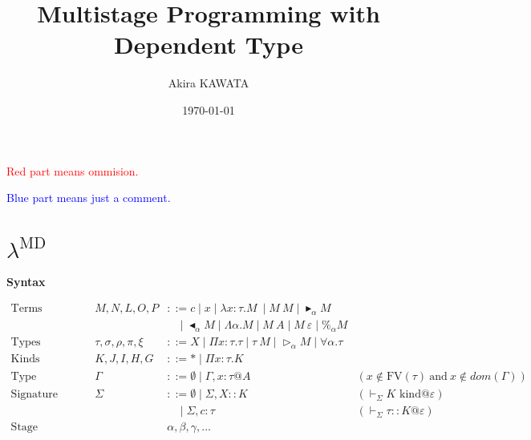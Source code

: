\documentclass[9pt, a4paper]{extarticle}
\title{Multistage Programming with Dependent Type}
\author{Akira KAWATA}
\date{\today}
\theoremstyle{break}
\newcommand{\figheader}[2]{
  \begin{flushleft}
    #2 {\bf \normalsize #1}
\end{flushleft}}
\newcommand{\G}{\Gamma}
\newcommand{\V}{\vdash_\Sigma}
\newcommand{\iskind}{\text{\ kind}}
\newcommand{\TW}{\triangleright}
\newcommand{\F}{\forall}
\newcommand{\TB}{\blacktriangleright}
\newcommand{\TBL}{\blacktriangleleft}
\newcommand{\red}[1]{\textcolor{red}{ #1 }}
\newcommand{\blue}[1]{\textcolor{blue}{ #1 }}
\begin{document}
\maketitle

\red{Red part means ommision.}

\blue{Blue part means just a comment.}

\section{ $ \lambda^{\text{MD}} $ }

\figheader{Syntax}{}

\begin{align*}
	\textrm{Terms}             &  & M,N,L,O,P                & ::= c \mid x \mid \lambda x:\tau.M\ \mid M\ M \mid \TB_\alpha M                                                                                    \\
	                           &  &                          & \ \ \ \ \mid \TBL_\alpha M \mid \Lambda\alpha.M \mid M\ A \mid M\ \varepsilon \mid \%_\alpha M                                                                       \\
	\textrm{Types}             &  & \tau,\sigma,\rho,\pi,\xi & ::= X \mid \Pi x:\tau.\tau \mid \tau\ M \mid \TW_{\alpha} M \mid \F\alpha.\tau                                                                     \\
	\textrm{Kinds}             &  & K,J,I,H,G                & ::= * \mid \Pi x:\tau.K                                                                                                                            \\
	\textrm{Type environments} &  & \Gamma                   & ::= \emptyset \mid \Gamma,x:\tau@A                                             & (x\not\in\textrm{FV}(\tau)\ \text{and}\ x\not\in\textit{dom}(\G)) \\
	\textrm{Signature}         &  & \Sigma                   & ::= \emptyset \mid \Sigma,X::K                                                 & (\V K \iskind @ \varepsilon)                                      \\
	                           &  &                          & \ \ \ \ \mid \Sigma,c:\tau                                                             & (\V \tau :: K @ \varepsilon)                                      \\
	\textrm{Stage variables}   &  &                          & \alpha,\beta,\gamma,...                                                                                                                            \\

\end{align*}
\end{document}
